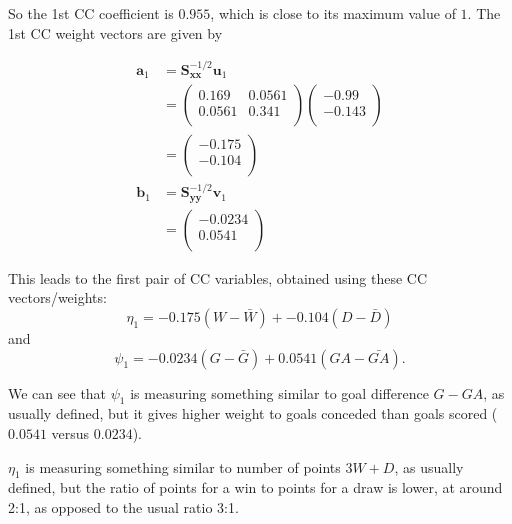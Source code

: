 \documentclass[
]{book}
\newenvironment{Shaded}{\begin{snugshade}}{\end{snugshade}}
\newcommand{\DecValTok}[1]{\textcolor[rgb]{0.00,0.00,0.81}{#1}}
\newcommand{\NormalTok}[1]{#1}
\newcommand{\OtherTok}[1]{\textcolor[rgb]{0.56,0.35,0.01}{#1}}
\newcommand{\SpecialCharTok}[1]{\textcolor[rgb]{0.81,0.36,0.00}{\textbf{#1}}}
\theoremstyle{definition}
\theoremstyle{definition}
\theoremstyle{definition}
\theoremstyle{definition}
\theoremstyle{remark}
\begin{document}
So the 1st CC coefficient is \(0.955\), which is close to its maximum value of \(1\). The 1st CC weight vectors are
given by

\begin{Shaded}
\end{Shaded}

\begin{align*}
\mathbf a_1&=\mathbf S_{\mathbf x\mathbf x}^{-1/2}\mathbf u_1\\
&=\begin{pmatrix}0.169&0.0561 \\0.0561&0.341 \\\end{pmatrix}\begin{pmatrix}-0.99 \\-0.143 \\\end{pmatrix}\\
&=\begin{pmatrix}-0.175 \\-0.104 \\\end{pmatrix}\\
\mathbf b_1 &=\mathbf S_{\mathbf y\mathbf y}^{-1/2}\mathbf v_1\\
&= \begin{pmatrix}-0.0234 \\0.0541 \\\end{pmatrix}
\end{align*}

This leads to the first pair of CC variables, obtained using these CC vectors/weights:
\[
\eta_1 =-0.175 (W-\bar{W}) +-0.104(D -\bar{D})
\]
and
\[
 \psi_1 = -0.0234(G-\bar{G}) +0.0541(GA-\bar{GA}).
\]

We can see that \(\psi_1\) is measuring something similar to goal difference \(G-GA\), as usually defined, but it gives higher weight to goals conceded than goals scored (\(0.0541\) versus \(0.0234\)).

\(\eta_1\) is measuring something similar to number of points \(3W+D\), as usually defined, but the ratio of points for a win to points for a draw is lower, at around 2:1, as opposed to the usual ratio 3:1.
\end{document}
